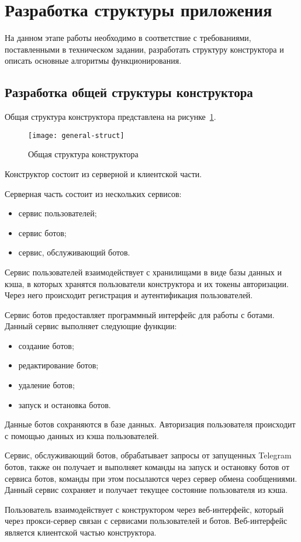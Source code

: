 
\newpage

\section{Разработка структуры приложения}

На данном этапе работы необходимо в соответствие с требованиями,
поставленными в техническом задании, разработать структуру конструктора
и описать основные алгоритмы функционирования.

\subsection{Разработка общей структуры конструктора }

Общая структура конструктора представлена на рисунке~\ref{f:general-struct}.

\begin{figure}[ht]
	\centering
	\texttt{[image: general-struct]}
	\caption{Общая структура конструктора}
	\label{f:general-struct}
\end{figure}


Конструктор состоит из серверной и клиентской части.

Серверная часть состоит из нескольких сервисов:
\begin{itemize}
	\item сервис пользователей;
	\item сервис ботов;
	\item сервис, обслуживающий ботов.
\end{itemize}

Сервис пользователей взаимодействует с хранилищами в виде базы
данных и кэша, в которых хранятся пользователи конструктора и их токены
авторизации. Через него происходит регистрация и аутентификация
пользователей.

Сервис ботов предоставляет программный интерфейс для работы с
ботами. Данный сервис выполняет следующие функции:
\begin{itemize}
	\item создание ботов;
	\item редактирование ботов;
	\item удаление ботов;
	\item запуск и остановка ботов.
\end{itemize}

Данные ботов сохраняются в базе данных. Авторизация пользователя
происходит с помощью данных из кэша пользователей.

Сервис, обслуживающий ботов, обрабатывает запросы от запущенных
Telegram ботов, также он получает и выполняет команды на запуск и
остановку ботов от сервиса ботов, команды при этом посылаются через сервер
обмена сообщениями. Данный сервис сохраняет и получает текущее состояние
пользователя из кэша.

Пользователь взаимодействует с конструктором через веб-интерфейс,
который через прокси-сервер связан с сервисами пользователей и ботов.
Веб-интерфейс является клиентской частью конструктора.





